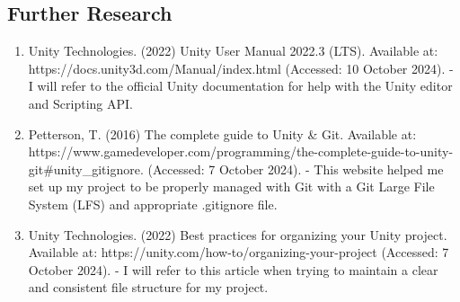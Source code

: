 \documentclass[12pt]{article}
\begin{document}
	\subsection{Further Research}
	\begin{enumerate}
	\item Unity Technologies. (2022) Unity User Manual 2022.3 (LTS). Available at: https://docs.unity3d.com/Manual/index.html (Accessed: 10 October 2024). - I will refer to the official Unity documentation for help with the Unity editor and Scripting API. 
	\item Petterson, T. (2016) The complete guide to Unity \& Git. Available at: https://www.gamedeveloper.com/programming/the-complete-guide-to-unity-git\#unity\_gitignore. (Accessed: 7 October 2024). - This website helped me set up my project to be properly managed with Git with a Git Large File System (LFS) and appropriate .gitignore file.
 	\item Unity Technologies. (2022) Best practices for organizing your Unity project. Available at: https://unity.com/how-to/organizing-your-project (Accessed: 7 October 2024). - I will refer to this article when trying to maintain a clear and consistent file structure for my project.
	\end{enumerate}
\end{document}
